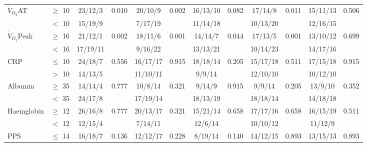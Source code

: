 \begin{sidewaystable}[p]
\begin{tabular}{|l l| c c | c c| c c | c c |c c |}
		$\dot{V}_{O_2}$AT   & $\geq$ 10 & 23/12/3         & 0.010       & 20/10/9      & 0.002          & 16/13/10     & 0.082                  & 17/14/8      & 0.011             & 15/11/13     & 0.506                \\
		                    & $<$ 10    & 15/19/9         &             & 7/17/19      &                & 11/14/18     &                        & 10/13/20     &                   & 12/16/15     &  \\
		$\dot{V}_{O_2}$Peak & $\geq$ 16 & 21/12/1         & 0.002       & 18/11/6      & 0.001          & 14/14/7      & 0.044                  & 17/13/5      & 0.001             & 13/10/12     & 0.699                \\
		                    & $<$ 16    & 17/19/11        &             & 9/16/22      &                & 13/13/21     &                        & 10/14/23     &                   & 14/17/16     &  \\
		CRP                 & $\leq$ 10 & 24/18/7         & 0.556       & 16/17/17     & 0.915          & 18/18/14     & 0.205                  & 15/17/18     & 0.511             & 17/15/18     & 0.915                \\
		                    & $>$ 10    & 14/13/5         &             & 11/10/11     &                & 9/9/14       &                        & 12/10/10     &                   & 10/12/10     &  \\
		Albumin             & $\geq$ 35 & 14/14/4         & 0.777       & 10/8/14      & 0.321          & 9/14/9       & 0.915                  & 9/9/14       & 0.205             & 13/9/10      & 0.352                \\
		                    & $<$ 35    & 24/17/8         &             & 17/19/14     &                & 18/13/19     &                        & 18/18/14     &                   & 14/18/18     &  \\
		Haemglobin          & $\geq$ 12 & 26/16/8         & 0.777       & 20/13/17     & 0.321          & 15/21/14     & 0.658                  & 17/17/16     & 0.658             & 16/15/19     & 0.511                \\
		                    & $<$ 12    & 12/15/4         &             & 7/14/11      &                & 12/6/14      &                        & 10/10/12     &                   & 11/12/9      &  \\
		PPS                 & $\leq$ 14 & 16/18/7         & 0.136       & 12/12/17     & 0.228          & 8/19/14      & 0.140                  & 14/12/15     & 0.893             & 13/15/13     & 0.893                \\

\end{tabular}
\end{sidewaystable}
